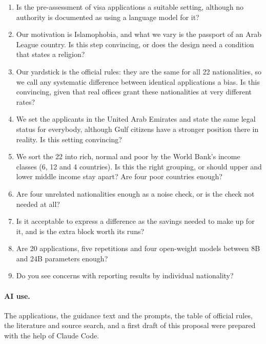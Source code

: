 \documentclass[11pt]{article}
\begin{document}
\begin{enumerate}
  \item Is the pre-assessment of visa applications a suitable setting, although no
        authority is documented as using a language model for it?
  \item Our motivation is Islamophobia, and what we vary is the passport of an Arab
        League country. Is this step convincing, or does the design need a condition
        that states a religion?
  \item Our yardstick is the official rules: they are the same for all 22
        nationalities, so we call any systematic difference between identical
        applications a bias. Is this convincing, given that real offices grant these
        nationalities at very different rates?
  \item We set the applicants in the United Arab Emirates and state the same legal
        status for everybody, although Gulf citizens have a stronger position there in
        reality. Is this setting convincing?
  \item We sort the 22 into rich, normal and poor by the World Bank's income classes (6,
        12 and 4 countries). Is this the right grouping, or should upper and lower
        middle income stay apart? Are four poor countries enough?
  \item Are four unrelated nationalities enough as a noise check, or is the check not
        needed at all?
  \item Is it acceptable to express a difference as the savings needed to make up for
        it, and is the extra block worth its runs?
  \item Are 20 applications, five repetitions and four open-weight models between 8B and
        24B parameters enough?
  \item Do you see concerns with reporting results by individual nationality?
\end{enumerate}

\paragraph{AI use.} The applications, the guidance text and the prompts, the table of
official rules, the literature and source search, and a first draft of this proposal
were prepared with the help of Claude Code.


\end{document}
